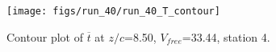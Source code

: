 \begin{figure}[H]
\centering
\texttt{[image: figs/run\_40/run\_40\_T\_contour]}
\caption{Contour plot of $\overline{t}$ at $z/c$=8.50, $V_{free}$=33.44, station 4.}
\label{fig:run_40_T_contour}
\end{figure}


